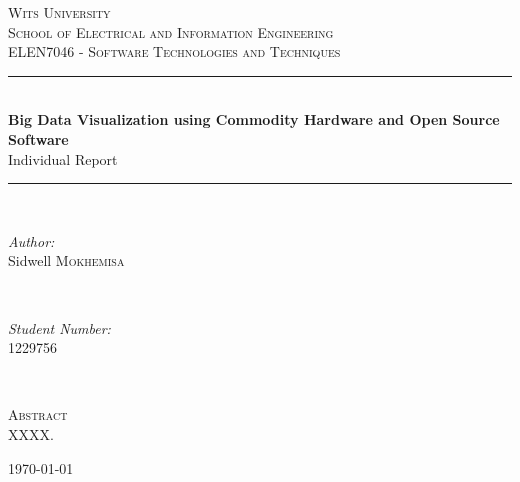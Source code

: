 \documentclass[12pt]{article} %
\begin{document}
	
	
	\begin{titlepage}
		
		\newcommand{\HRule}{\rule{\linewidth}{0.5mm}} %
		
		\center %
		
		\textsc{\LARGE Wits University}\\[1.5cm] %
		\textsc{\Large School of Electrical and Information Engineering}\\[0.5cm] %
		\textsc{\large ELEN7046 - Software Technologies and Techniques}\\[0.5cm] %
		
		\HRule \\[0.4cm]
		{ \huge \bfseries Big Data Visualization using Commodity Hardware and Open Source Software}\\[0.4cm] %
		
		Individual Report
		
		\HRule \\[0.6cm]
		
		
		\begin{minipage}
			{0.4
				\textwidth} 
			\begin{flushleft}
				\large \emph{Author:}\\
				Sidwell \textsc{Mokhemisa} \\
			\end{flushleft}
		\end{minipage}
		~ 
		\begin{minipage}
			{0.4
				\textwidth} 
			\begin{flushright}
				\large \emph{Student Number:} \\
				1229756 \\
			\end{flushright}
		\end{minipage}
		\\[1cm]
		
		\begin{flushleft}\large
			\textsc{Abstract}\\
			XXXX.
			
		\end{flushleft}
		{\large \today}\\[3cm] %
		
		
		\vfill %
		
	\end{titlepage}
	
\end{document}
